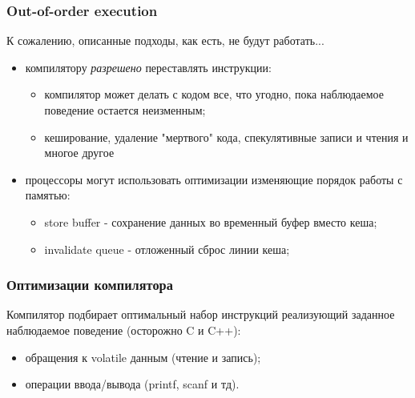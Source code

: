\begin{frame}
\frametitle{Out-of-order execution}

К сожалению, описанные подходы, как есть, не будут работать...
\begin{itemize}
  \item<2-> компилятору \emph{разрешено} переставлять инструкции:
        \begin{itemize}
          \item компилятор может делать с кодом все, что угодно, пока
                наблюдаемое поведение остается неизменным;
          \item кеширование, удаление "мертвого" кода, спекулятивные записи и
                чтения и многое другое
        \end{itemize}
  \item<3-> процессоры могут использовать оптимизации изменяющие порядок работы
        с памятью:
        \begin{itemize}
          \item store buffer - сохранение данных во временный буфер вместо
                кеша;
          \item invalidate queue - отложенный сброс линии кеша;
        \end{itemize}
\end{itemize}
\end{frame}

\begin{frame}
\frametitle{Оптимизации компилятора}

Компилятор подбирает оптимальный набор инструкций реализующий заданное
наблюдаемое поведение (осторожно C и C++):
\begin{itemize}
  \item обращения к volatile данным (чтение и запись);
  \item операции ввода/вывода (printf, scanf и тд).
\end{itemize}

\end{frame}

